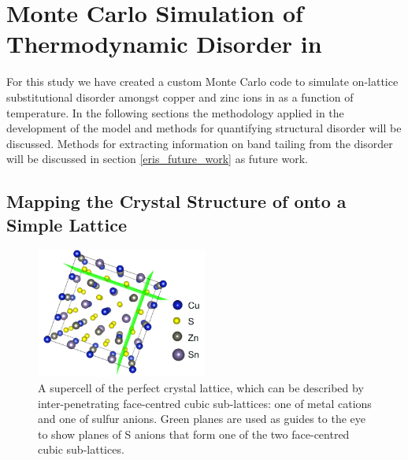 \chapter{Monte Carlo Simulation of Thermodynamic Disorder in \CZTS}\label{MC_section}
For this study we have created a custom Monte Carlo code to simulate on-lattice  substitutional disorder amongst copper and zinc ions in {\CZTS} as a function of temperature. In the following sections the methodology applied in the development of the model and methods for quantifying structural disorder will be discussed. Methods for extracting information on band tailing from the disorder will be discussed in section \ref{eris_future_work} as future work.


\section{Mapping the Crystal Structure of { \CZTS } onto a Simple Lattice}\label{mapping}

\begin{figure}[h!]
  \centering
    \includegraphics[width=0.5\textwidth]{figures/CZTS_lattice_mapping.png}
    \caption{A supercell of the perfect{ \CZTS } crystal lattice, which can be described by inter-penetrating face-centred cubic sub-lattices: one of metal cations and one of sulfur anions. Green planes are used as guides to the eye to show planes of S anions that form one of the two face-centred cubic sub-lattices.}
  \label{CZTS_lattice_mapping}
\end{figure}

